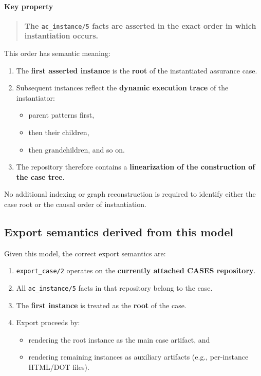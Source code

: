\documentclass[12pt,twoside,a4paper]{article}
\begin{document}
\paragraph{Key property}
\begin{quote}
\textbf{The \texttt{ac\_instance/5} facts are asserted in the exact order in which instantiation occurs.}
\end{quote}

This order has semantic meaning:

\begin{enumerate}
  \item The \textbf{first asserted instance} is the \textbf{root} of the instantiated assurance case.
  \item Subsequent instances reflect the \textbf{dynamic execution trace} of the instantiator:
  \begin{itemize}
    \item parent patterns first,
    \item then their children,
    \item then grandchildren, and so on.
  \end{itemize}
  \item The repository therefore contains a \textbf{linearization of the construction of the case tree}.
\end{enumerate}

No additional indexing or graph reconstruction is required to identify either the case root or the causal order of instantiation.

\subsection{Export semantics derived from this model}
\label{subsec:export-semantics}

Given this model, the correct export semantics are:

\begin{enumerate}
  \item \texttt{export\_case/2} operates on the \textbf{currently attached CASES repository}.
  \item All \texttt{ac\_instance/5} facts in that repository belong to the case.
  \item The \textbf{first instance} is treated as the \textbf{root} of the case.
  \item Export proceeds by:
  \begin{itemize}
    \item rendering the root instance as the main case artifact, and
    \item rendering remaining instances as auxiliary artifacts (e.g., per-instance HTML/DOT files).
  \end{itemize}
\end{enumerate}
\end{document}

